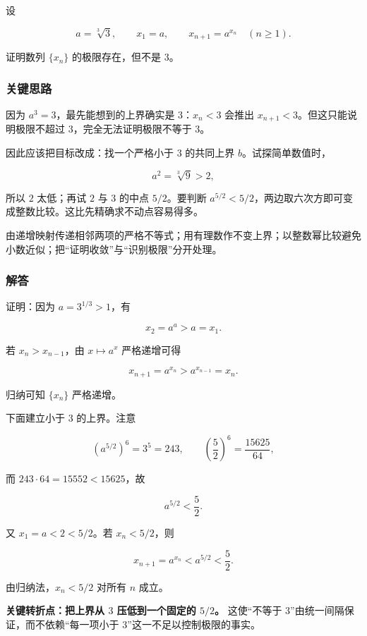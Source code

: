 \documentclass[11pt,a4paper]{article}
\begin{document}
设

\[
a=\sqrt[3]{3},\qquad x_1=a,\qquad x_{n+1}=a^{x_n}\quad(n\ge1).
\]

证明数列 \(\{x_n\}\) 的极限存在，但不是 \(3\)。

\subsubsection{关键思路}\label{ux5173ux952eux601dux8def-20}

因为 \(a^3=3\)，最先能想到的上界确实是 \(3\)：\(x_n<3\) 会推出
\(x_{n+1}<3\)。但这只能说明极限不超过 \(3\)，完全无法证明极限不等于
\(3\)。

因此应该把目标改成：找一个严格小于 \(3\) 的共同上界
\(b\)。试探简单数值时，

\[
a^2=\sqrt[3]{9}>2,
\]

所以 \(2\) 太低；再试 \(2\) 与 \(3\) 的中点 \(5/2\)。要判断
\(a^{5/2}<5/2\)，两边取六次方即可变成整数比较。这比先精确求不动点容易得多。

由递增映射传递相邻两项的严格不等式；用有理数作不变上界；以整数幂比较避免小数近似；把``证明收敛''与``识别极限''分开处理。

\subsubsection{解答}\label{ux89e3ux7b54-20}

证明：因为 \(a=3^{1/3}>1\)，有

\[
x_2=a^a>a=x_1.
\]

若 \(x_n>x_{n-1}\)，由 \(x\mapsto a^x\) 严格递增可得

\[
x_{n+1}=a^{x_n}>a^{x_{n-1}}=x_n.
\]

归纳可知 \(\{x_n\}\) 严格递增。

下面建立小于 \(3\) 的上界。注意

\[
\left(a^{5/2}\right)^6=3^5=243,
\qquad
\left(\frac52\right)^6=\frac{15625}{64},
\]

而 \(243\cdot64=15552<15625\)，故

\[
a^{5/2}<\frac52.
\]

又 \(x_1=a<2<5/2\)。若 \(x_n<5/2\)，则

\[
x_{n+1}=a^{x_n}<a^{5/2}<\frac52.
\]

由归纳法，\(x_n<5/2\) 对所有 \(n\) 成立。

\textbf{关键转折点：把上界从 \(3\) 压低到一个固定的 \(5/2\)。}
这使``不等于 \(3\)''由统一间隔保证，而不依赖``每一项小于
\(3\)''这一不足以控制极限的事实。
\end{document}
